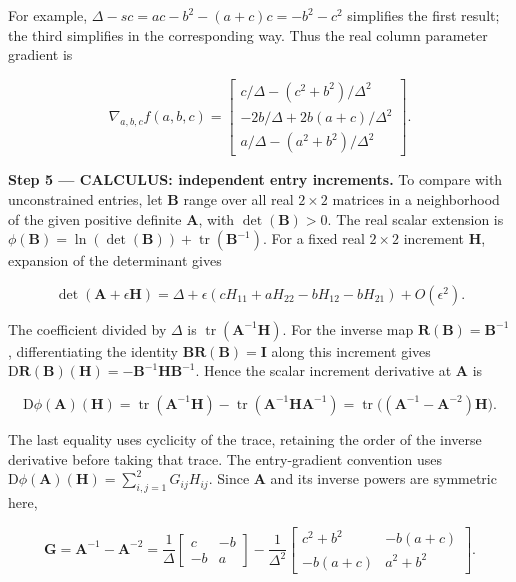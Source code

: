 \documentclass[11pt,oneside,openany]{book}
\begin{document}
For example, \(\Delta-sc=ac-b^2-(a+c)c=-b^2-c^2\) simplifies the first result; the third simplifies in the corresponding way. Thus the real column parameter gradient is

\[
\nabla_{a,b,c}f(a,b,c)=
\begin{bmatrix}
c/\Delta-(c^2+b^2)/\Delta^2\\
-2b/\Delta+2b(a+c)/\Delta^2\\
a/\Delta-(a^2+b^2)/\Delta^2
\end{bmatrix}.
\]

\textbf{Step 5 --- CALCULUS: independent entry increments.} To compare with unconstrained entries, let \(\mathbf B\) range over all real \(2\times2\) matrices in a neighborhood of the given positive definite \(\mathbf A\), with \(\det(\mathbf B)>0\). The real scalar extension is \(\phi(\mathbf B)=\ln(\det(\mathbf B))+\operatorname{tr}(\mathbf B^{-1})\). For a fixed real \(2\times2\) increment \(\mathbf H\), expansion of the determinant gives

\[
\det(\mathbf A+\epsilon\mathbf H)
=\Delta+\epsilon(cH_{11}+aH_{22}-bH_{12}-bH_{21})+O(\epsilon^2).
\]

The coefficient divided by \(\Delta\) is \(\operatorname{tr}(\mathbf A^{-1}\mathbf H)\). For the inverse map \(\mathbf R(\mathbf B)=\mathbf B^{-1}\), differentiating the identity \(\mathbf B\mathbf R(\mathbf B)=\mathbf I\) along this increment gives \(\mathrm D\mathbf R(\mathbf B)(\mathbf H)=-\mathbf B^{-1}\mathbf H\mathbf B^{-1}\). Hence the scalar increment derivative at \(\mathbf A\) is

\[
\mathrm D\phi(\mathbf A)(\mathbf H)
=\operatorname{tr}(\mathbf A^{-1}\mathbf H)
-\operatorname{tr}(\mathbf A^{-1}\mathbf H\mathbf A^{-1})
=\operatorname{tr}\bigl((\mathbf A^{-1}-\mathbf A^{-2})\mathbf H\bigr).
\]

The last equality uses cyclicity of the trace, retaining the order of the inverse derivative before taking that trace. The entry-gradient convention uses \(\mathrm D\phi(\mathbf A)(\mathbf H)=\sum_{i,j=1}^2G_{ij}H_{ij}\). Since \(\mathbf A\) and its inverse powers are symmetric here,

\[
\mathbf G=\mathbf A^{-1}-\mathbf A^{-2}
=\frac1\Delta\begin{bmatrix}c&-b\\-b&a\end{bmatrix}
-\frac1{\Delta^2}\begin{bmatrix}c^2+b^2&-b(a+c)\\-b(a+c)&a^2+b^2\end{bmatrix}.
\]
\end{document}
